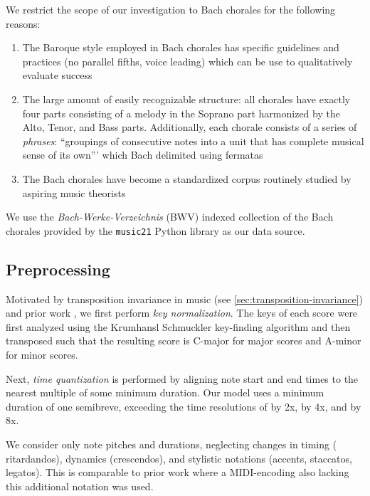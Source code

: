 We restrict the scope of our investigation to Bach chorales for the following reasons:
\begin{enumerate}
  \item The Baroque style employed in Bach chorales has specific guidelines and
    practices \citep{piston1978harmony} (\eg no parallel fifths, voice leading)
    which can be use to qualitatively evaluate success
  \item The large amount of easily recognizable structure: all chorales have
    exactly four parts consisting of a melody in the Soprano part harmonized by
    the Alto, Tenor, and Bass parts. Additionally, each chorale consists of a
    series of \emph{phrases}: ``groupings of consecutive notes into a unit that
    has complete musical sense of its own'''\citep{nattiez1990music} which Bach
    delimited using fermatas
  \item The Bach chorales have become a standardized corpus routinely studied
    by aspiring music theorists\citep{white2002guidelines}
\end{enumerate}
We use the \emph{Bach-Werke-Verzeichnis} (BWV) \citep{butt1999bach} indexed
collection of the Bach chorales provided by the
\texttt{music21}\citep{Scott2015} Python library as our data source.

\subsection{Preprocessing}\label{sec:preprocessing}


Motivated by transposition invariance in music (see
\vref{sec:transposition-invariance}) and prior work
\citep{mozer1994neural,Eck2002,franklin2004recurrent,franklin2005jazz}, we
first perform \emph{key normalization}. The keys of each score were first
analyzed using the Krumhansl Schmuckler key-finding algorithm
\citep{krumhansl2001cognitive} and then transposed such that the resulting
score is C-major for major scores and A-minor for minor scores.

Next, \emph{time quantization} is performed by aligning note start and end
times to the nearest multiple of some minimum duration. Our model uses a
minimum duration of one semibreve, exceeding the time resolutions of
\citep{Boulanger-Lewandowski2012,Eck2002} by 2x,
\citep{hild1991harmonet} by 4x, and \citep{bellgard1994harmonizing} by 8x.

We consider only note pitches and durations, neglecting changes in timing (\eg
ritardandos), dynamics (\eg crescendos), and stylistic notations (\eg accents,
staccatos, legatos). This is comparable to prior work
\citep{Boulanger-Lewandowski2012,pascanu2013construct} where a MIDI-encoding
also lacking this additional notation was used.

